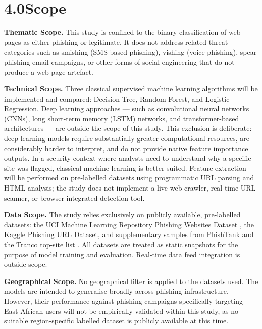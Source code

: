 \documentclass[11pt,letterpaper]{article}
\begin{document}
\newpage
\section*{4.0\quad Scope}

\textbf{Thematic Scope.} This study is confined to the binary classification of web pages as either phishing or legitimate. It does not address related threat categories such as smishing (SMS-based phishing), vishing (voice phishing), spear phishing email campaigns, or other forms of social engineering that do not produce a web page artefact.

\textbf{Technical Scope.} Three classical supervised machine learning algorithms will be implemented and compared: Decision Tree, Random Forest, and Logistic Regression. Deep learning approaches --- such as convolutional neural networks (CNNs), long short-term memory (LSTM) networks, and transformer-based architectures --- are outside the scope of this study. This exclusion is deliberate: deep learning models require substantially greater computational resources, are considerably harder to interpret, and do not provide native feature importance outputs. In a security context where analysts need to understand why a specific site was flagged, classical machine learning is better suited. Feature extraction will be performed on pre-labelled datasets using programmatic URL parsing and HTML analysis; the study does not implement a live web crawler, real-time URL scanner, or browser-integrated detection tool.

\textbf{Data Scope.} The study relies exclusively on publicly available, pre-labelled datasets: the UCI Machine Learning Repository Phishing Websites Dataset \cite{uci_phishing}, the Kaggle Phishing URL Dataset, and supplementary samples from PhishTank \cite{phishtank} and the Tranco top-site list \cite{tranco}. All datasets are treated as static snapshots for the purpose of model training and evaluation. Real-time data feed integration is outside scope.

\textbf{Geographical Scope.} No geographical filter is applied to the datasets used. The models are intended to generalise broadly across phishing infrastructure. However, their performance against phishing campaigns specifically targeting East African users will not be empirically validated within this study, as no suitable region-specific labelled dataset is publicly available at this time.
\end{document}
